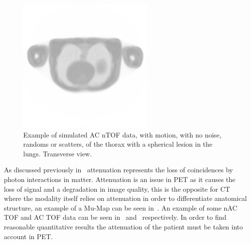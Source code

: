                 \begin{figure} %
                    \centering
                    
                    \includegraphics[width=1.0\linewidth]{figures/background_ac_example.png}
                    
                    \captionsetup{singlelinecheck=false, justification=raggedright}
                    \caption{Example of simulated \gls{AC} \gls{nTOF} data, with motion, with no noise, randoms or scatters, of the thorax with a spherical lesion in the lungs. Transverse view.} \label{fig:combined_pet_ct_ac_tof_example}
                \end{figure}
                
                As discussed previously in~ attenuation represents the loss of coincidences by photon interactions in matter. Attenuation is an issue in \gls{PET} as it causes the loss of signal and a degradation in image quality, this is the opposite for \gls{CT} where the modality itself relies on attenuation in order to differentiate anatomical structure, an example of a \gls{Mu-Map} can be seen in~. An example of some \gls{nAC} \gls{TOF} and \gls{AC} \gls{TOF} data can be seen in~ and~ respectively. In order to find reasonable quantitative results the attenuation of the patient must be taken into account in \gls{PET}. %
                
